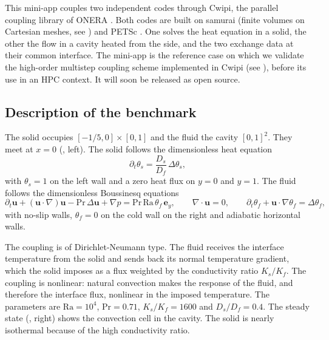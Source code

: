 \label{sec:app:specs:app-samurai-cwipi}



This mini-app couples two independent codes through Cwipi, the parallel
coupling library of ONERA \cite{quemerais_cwipi_2026}. Both codes are built on
samurai \cite{bellotti_multiresolution-based_2022} (finite volumes on Cartesian
meshes, see ) and PETSc \cite{balay_petsc_2024}. One
solves the heat equation in a solid, the other the flow in a cavity heated from
the side, and the two exchange data at their common interface. The mini-app is the
reference case on which we validate the high-order multistep coupling scheme
implemented in Cwipi (see ), before its use in an HPC context.
It will soon be released as open source.



\subsection{Description of the benchmark}

The solid occupies $[-1/5, 0]\times[0,1]$ and the fluid the cavity $[0,1]^2$.
They meet at $x = 0$ (, left). The solid
follows the dimensionless heat equation
\begin{equation}\label{eq:specs:samurai:cwipi:solid}
  \partial_t \theta_s = \frac{D_s}{D_f}\,\Delta \theta_s,
\end{equation}
with $\theta_s = 1$ on the left wall and a zero heat flux on $y = 0$ and
$y = 1$. The fluid follows the dimensionless Boussinesq equations
\begin{equation}\label{eq:specs:samurai:cwipi:fluid}
  \partial_t \mathbf{u} + (\mathbf{u}\cdot\nabla)\mathbf{u}
  - \mathrm{Pr}\,\Delta \mathbf{u} + \nabla p
  = \mathrm{Pr}\,\mathrm{Ra}\,\theta_f\,\mathbf{e}_y,
  \qquad \nabla\cdot\mathbf{u} = 0,
  \qquad \partial_t \theta_f + \mathbf{u}\cdot\nabla\theta_f = \Delta\theta_f,
\end{equation}
with no-slip walls, $\theta_f = 0$ on the cold wall on the right and adiabatic
horizontal walls.

The coupling is of Dirichlet-Neumann type. The fluid receives the interface
temperature from the solid and sends back its normal temperature gradient,
which the solid imposes as a flux weighted by the conductivity ratio
$K_s/K_f$. The coupling is nonlinear: natural convection makes the response of
the fluid, and therefore the interface flux, nonlinear in the imposed
temperature. The parameters are $\mathrm{Ra} = 10^4$, $\mathrm{Pr} = 0.71$,
$K_s/K_f = 1600$ and $D_s/D_f = 0.4$. The steady state
(, right) shows the convection cell in the
cavity. The solid is nearly isothermal because of the high conductivity
ratio.

